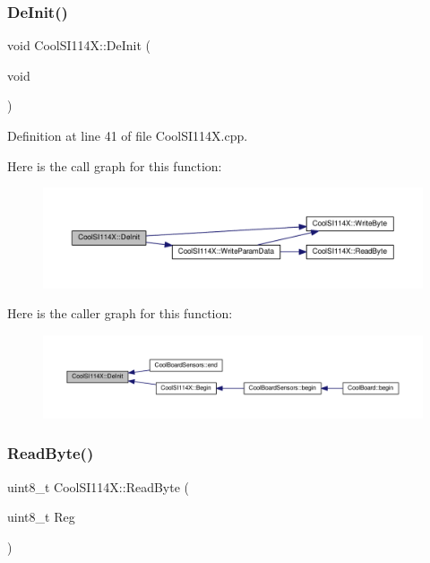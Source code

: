 \subsubsection{\texorpdfstring{De\+Init()}{DeInit()}}
{\footnotesize\ttfamily void Cool\+S\+I114\+X\+::\+De\+Init (\begin{DoxyParamCaption}\item[{void}]{ }\end{DoxyParamCaption})}



Definition at line 41 of file Cool\+S\+I114\+X.\+cpp.

Here is the call graph for this function\+:\nopagebreak
\begin{figure}[H]
\begin{center}
\leavevmode
\includegraphics[width=350pt]{class_cool_s_i114_x_a6840abd53a2e3d71a6bb918077c6d6e6_cgraph}
\end{center}
\end{figure}
Here is the caller graph for this function\+:\nopagebreak
\begin{figure}[H]
\begin{center}
\leavevmode
\includegraphics[width=350pt]{class_cool_s_i114_x_a6840abd53a2e3d71a6bb918077c6d6e6_icgraph}
\end{center}
\end{figure}
\mbox{\label{class_cool_s_i114_x_acc20f8037e156ec4aadcbe90780b1e8b}} 
\subsubsection{\texorpdfstring{Read\+Byte()}{ReadByte()}}
{\footnotesize\ttfamily uint8\+\_\+t Cool\+S\+I114\+X\+::\+Read\+Byte (\begin{DoxyParamCaption}\item[{uint8\+\_\+t}]{Reg }\end{DoxyParamCaption})\hspace{0.3cm}{\ttfamily [private]}}




